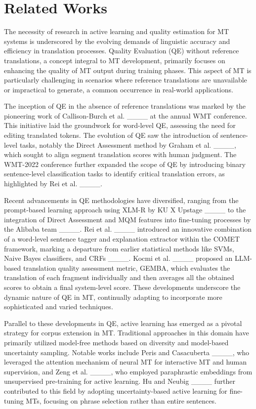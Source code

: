 \section{Related Works}
The necessity of research in active learning and quality estimation for MT systems is underscored by the evolving demands of linguistic accuracy and efficiency in translation processes. Quality Evaluation (QE) without reference translations, a concept integral to MT development, primarily focuses on enhancing the quality of MT output during training phases. This aspect of MT is particularly challenging in scenarios where reference translations are unavailable or impractical to generate, a common occurrence in real-world applications.

The inception of QE in the absence of reference translations was marked by the pioneering work of Callison-Burch et al. ____ at the annual WMT conference. This initiative laid the groundwork for word-level QE, assessing the need for editing translated tokens. The evolution of QE saw the introduction of sentence-level tasks, notably the Direct Assessment method by Graham et al. ____, which sought to align segment translation scores with human judgment. The WMT-2022 conference further expanded the scope of QE by introducing binary sentence-level classification tasks to identify critical translation errors, as highlighted by Rei et al. ____.

Recent advancements in QE methodologies have diversified, ranging from the prompt-based learning approach using XLM-R by KU X Upstage ____ to the integration of Direct Assessment and MQM features into fine-tuning processes by the Alibaba team ____. Rei et al. ____ introduced an innovative combination of a word-level sentence tagger and explanation extractor within the COMET framework, marking a departure from earlier statistical methods like SVMs, Naive Bayes classifiers, and CRFs ____. Kocmi et al. ____ proposed an LLM-based translation quality assessment metric, GEMBA, which evaluates the translation of each fragment individually and then averages all the obtained scores to obtain a final system-level score. These developments underscore the dynamic nature of QE in MT, continually adapting to incorporate more sophisticated and varied techniques. 

Parallel to these developments in QE, active learning has emerged as a pivotal strategy for corpus extension in MT. Traditional approaches in this domain have primarily utilized model-free methods based on diversity and model-based uncertainty sampling. Notable works include Peris and Casacuberta ____, who leveraged the attention mechanism of neural MT for interactive MT and human supervision, and Zeng et al. ____, who employed paraphrastic embeddings from unsupervised pre-training for active learning. Hu and Neubig ____ further contributed to this field by adopting uncertainty-based active learning for fine-tuning MTs, focusing on phrase selection rather than entire sentences.